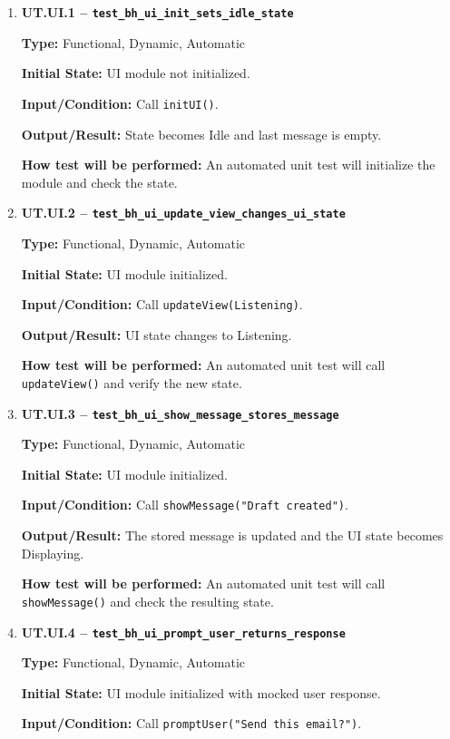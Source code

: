 \documentclass[12pt, titlepage]{article}
\begin{document}
\begin{enumerate}

\item \textbf{UT.UI.1 --
\texttt{test\_bh\_ui\_init\_sets\_idle\_state}}

\textbf{Type:} Functional, Dynamic, Automatic

\textbf{Initial State:} UI module not initialized.

\textbf{Input/Condition:} Call \texttt{initUI()}.

\textbf{Output/Result:} State becomes Idle and last message is empty.

\textbf{How test will be performed:} An automated unit test will initialize the
module and check the state.

\item \textbf{UT.UI.2 --
\texttt{test\_bh\_ui\_update\_view\_changes\_ui\_state}}

\textbf{Type:} Functional, Dynamic, Automatic

\textbf{Initial State:} UI module initialized.

\textbf{Input/Condition:} Call \texttt{updateView(Listening)}.

\textbf{Output/Result:} UI state changes to Listening.

\textbf{How test will be performed:} An automated unit test will call
\texttt{updateView()} and verify the new state.

\item \textbf{UT.UI.3 --
\texttt{test\_bh\_ui\_show\_message\_stores\_message}}

\textbf{Type:} Functional, Dynamic, Automatic

\textbf{Initial State:} UI module initialized.

\textbf{Input/Condition:} Call \texttt{showMessage("Draft created")}.

\textbf{Output/Result:} The stored message is updated and the UI state becomes
Displaying.

\textbf{How test will be performed:} An automated unit test will call
\texttt{showMessage()} and check the resulting state.

\item \textbf{UT.UI.4 --
\texttt{test\_bh\_ui\_prompt\_user\_returns\_response}}

\textbf{Type:} Functional, Dynamic, Automatic

\textbf{Initial State:} UI module initialized with mocked user response.

\textbf{Input/Condition:} Call \texttt{promptUser("Send this email?")}.


\end{enumerate}
\end{document}
